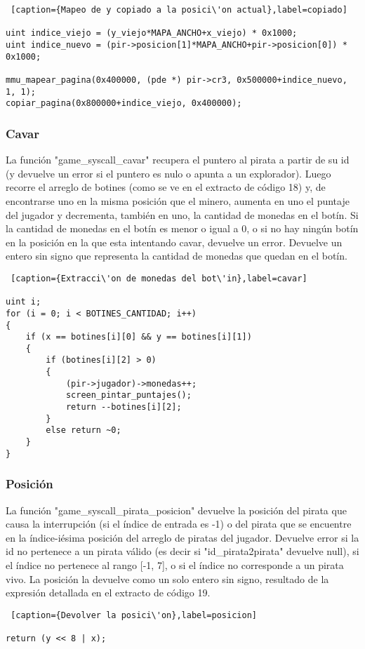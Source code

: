 \begin{lstlisting} [caption={Mapeo de y copiado a la posici\'on actual},label=copiado]    

uint indice_viejo = (y_viejo*MAPA_ANCHO+x_viejo) * 0x1000;                                
uint indice_nuevo = (pir->posicion[1]*MAPA_ANCHO+pir->posicion[0]) * 0x1000;          
                                                                                          
mmu_mapear_pagina(0x400000, (pde *) pir->cr3, 0x500000+indice_nuevo, 1, 1);               
copiar_pagina(0x800000+indice_viejo, 0x400000);	

\end{lstlisting}

\subsubsection*{Cavar}
\par La funci\'on "game_syscall_cavar" recupera el puntero al pirata a partir de su id (y devuelve un error si el puntero es nulo o apunta a un explorador).
Luego recorre el arreglo de botines (como se ve en el extracto de c\'odigo 18) y, de encontrarse uno en la misma posici\'on que el minero, aumenta en uno el puntaje del jugador y decrementa, tambi\'en en uno, la cantidad de monedas en el bot\'in.
Si la cantidad de monedas en el bot\'in es menor o igual a 0, o si no hay ning\'un bot\'in en la posici\'on en la que esta intentando cavar, devuelve un error.
Devuelve un entero sin signo que representa la cantidad de monedas que quedan en el bot\'in.

\begin{lstlisting} [caption={Extracci\'on de monedas del bot\'in},label=cavar]

uint i;
for (i = 0; i < BOTINES_CANTIDAD; i++)
{
    if (x == botines[i][0] && y == botines[i][1])
    {
        if (botines[i][2] > 0) 
        {
            (pir->jugador)->monedas++;
            screen_pintar_puntajes();
            return --botines[i][2];
        }
        else return ~0;
    }
}

\end{lstlisting}


\subsubsection*{Posici\'on}
\par La funci\'on "game_syscall_pirata_posicion" devuelve la posici\'on del pirata que causa la interrupci\'on (si el \'indice de entrada es -1) o del pirata que se encuentre en la \'indice-i\'esima posici\'on del arreglo de piratas del jugador. Devuelve error si la id no pertenece a un pirata v\'alido (es decir si "id_pirata2pirata" devuelve null), si el \'indice no pertenece al rango [-1, 7], o si el \'indice no corresponde a un pirata vivo. La posici\'on la devuelve como un solo entero sin signo, resultado de la expresi\'on detallada en el extracto de c\'odigo 19.

\begin{lstlisting} [caption={Devolver la posici\'on},label=posicion]

return (y << 8 | x);

\end{lstlisting}
